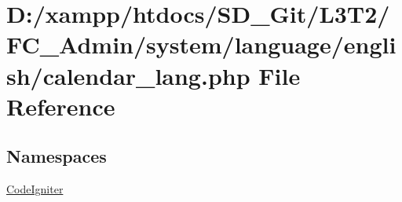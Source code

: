 \hypertarget{calendar__lang_8php}{}\section{D\+:/xampp/htdocs/\+S\+D\+\_\+\+Git/\+L3\+T2/\+F\+C\+\_\+\+Admin/system/language/english/calendar\+\_\+lang.php File Reference}
\label{calendar__lang_8php}
\subsection*{Namespaces}
\begin{DoxyCompactItemize}
\item 
 \hyperlink{namespace_code_igniter}{Code\+Igniter}
\end{DoxyCompactItemize}
